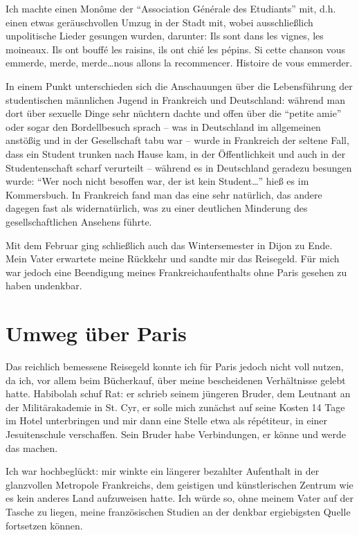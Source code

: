 Ich machte einen Monôme der \enquote{Association Générale des Etudiants} mit, d.h. einen etwas geräuschvollen Umzug in der Stadt mit, wobei ausschließlich unpolitische Lieder gesungen wurden, darunter: Ils sont dans les vignes, les moineaux. Ils ont bouffé les raisins, ils ont chié les pépins. Si cette chanson vous emmerde, merde, merde\dots nous allons la recommencer. Histoire de vous emmerder.

In einem Punkt unterschieden sich die Anschauungen über die Lebensführung der studentischen männlichen Jugend in Frankreich und Deutschland: während man dort über sexuelle Dinge sehr nüchtern dachte und offen über die \enquote{petite amie} oder sogar den Bordellbesuch sprach -- was in Deutschland im allgemeinen anstößig und in der Gesellschaft tabu war -- wurde in Frankreich der seltene Fall, dass ein Student trunken nach Hause kam, in der Öffentlichkeit und auch in der Studentenschaft scharf verurteilt -- während es in Deutschland geradezu besungen wurde: \enquote{Wer noch nicht besoffen war, der ist kein Student\dots} hieß es im Kommersbuch. In Frankreich fand man das eine sehr natürlich, das andere dagegen fast als widernatürlich, was zu einer deutlichen Minderung des gesellschaftlichen Ansehens führte.

Mit dem Februar ging schließlich auch das Wintersemester in Dijon zu Ende. Mein Vater erwartete meine Rückkehr und sandte mir das Reisegeld. Für mich war jedoch eine Beendigung meines Frankreichaufenthalts ohne Paris gesehen zu haben undenkbar.


\section{Umweg über Paris}

Das reichlich bemessene Reisegeld konnte ich für Paris jedoch nicht voll nutzen, da ich, vor allem beim Bücherkauf, über meine bescheidenen Verhältnisse gelebt hatte. Habibolah schuf Rat: er schrieb seinem jüngeren Bruder, dem Leutnant an der Militärakademie in St. Cyr, er solle mich zunächst auf seine Kosten 14 Tage im Hotel unterbringen und mir dann eine Stelle etwa als répétiteur, in einer Jesuitenschule verschaffen. Sein Bruder habe Verbindungen, er könne und werde das machen.

Ich war hochbeglückt: mir winkte ein längerer bezahlter Aufenthalt in der glanzvollen Metropole Frankreichs, dem geistigen und künstlerischen Zentrum wie es kein anderes Land aufzuweisen hatte. Ich würde so, ohne meinem Vater auf der Tasche zu liegen, meine französischen Studien an der denkbar ergiebigsten Quelle fortsetzen können.

